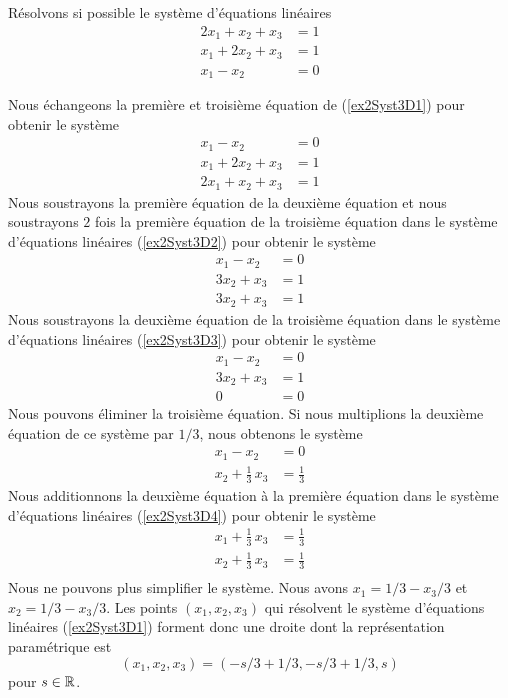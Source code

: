 {\begin{egg}
Résolvons si possible le système d'équations linéaires
\begin{equation}\label{ex2Syst3D1}
\begin{split}
2x_1 + x_2 + x_3 &= 1\\
x_1 + 2x_2 + x_3 &= 1\\
x_1 - x_2 &= 0
\end{split}
\end{equation}

Nous échangeons la première et troisième équation de (\ref{ex2Syst3D1})
pour obtenir le système
\begin{equation}\label{ex2Syst3D2}
\begin{split}
x_1 - x_2 &= 0\\
x_1 + 2x_2 + x_3 &= 1\\
2x_1 + x_2 + x_3 &= 1
\end{split}
\end{equation}
Nous soustrayons la première équation de la deuxième équation et nous
soustrayons $2$ fois la première équation de la troisième équation dans
le système d'équations linéaires (\ref{ex2Syst3D2}) pour obtenir le
système
\begin{equation}\label{ex2Syst3D3}
\begin{split}
x_1 - x_2 &= 0\\
3x_2 + x_3 &= 1\\
3x_2 + x_3 &= 1
\end{split}
\end{equation}
Nous soustrayons la deuxième équation de la troisième équation dans le
système d'équations linéaires (\ref{ex2Syst3D3}) pour obtenir le système
\[
\begin{split}
x_1 - x_2 &= 0\\
3x_2 + x_3 &= 1\\
0 &= 0
\end{split}
\]
Nous pouvons éliminer la troisième équation.  Si nous multiplions la deuxième
équation de ce système par $1/3$, nous obtenons le système
\begin{equation}\label{ex2Syst3D4}
\begin{split}
x_1 - x_2 &= 0\\
x_2 + \frac{1}{3}\,x_3 &= \frac{1}{3}
\end{split}
\end{equation}
Nous additionnons la deuxième équation à la première équation dans le
système d'équations linéaires (\ref{ex2Syst3D4}) pour obtenir le
système
\begin{equation}\label{ex2Syst3D5}
\begin{split}
x_1 + \frac{1}{3}\,x_3 &= \frac{1}{3}\\
x_2 + \frac{1}{3}\,x_3 &= \frac{1}{3}\\
\end{split}
\end{equation}
Nous ne pouvons plus simplifier le système.  Nous avons $x_1 = 1/3 - x_3/3$ et
$x_2= 1/3 - x_3/3$.  Les points $(x_1,x_2,x_3)$ qui résolvent le système
d'équations linéaires (\ref{ex2Syst3D1}) forment donc une droite dont
la représentation paramétrique est
\[
(x_1,x_2,x_3) = \left( -s/3 + 1/3, -s/3 + 1/3, s\right)
\]
pour $s \in \mathbb{R}$.


\end{egg}}
